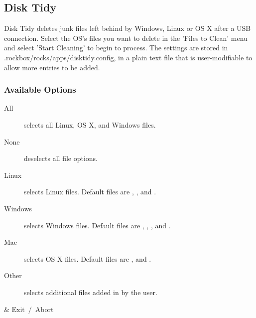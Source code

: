 \subsection{Disk Tidy}
  Disk Tidy deletes junk files left behind by Windows, Linux or OS X after a USB connection.
  Select the OS's files you want to delete in the 'Files to Clean'
  menu and select 'Start Cleaning' to begin to process. The settings
  are stored in .rockbox/rocks/apps/disktidy.config, in a plain text
  file that is user-modifiable to allow more entries to be added.

  \subsubsection{Available Options}
  \begin{description}
    \item[All] selects all Linux, OS X, and Windows files.
    \item[None] deselects all file options.
    \item[Linux] selects Linux files. Default files are
      , , and .
    \item[Windows] selects Windows files. Default files are
      , , ,  and
      .
    \item[Mac] selects OS X files. Default files are ,  and
      .
    \item[Other] selects additional files added in by the user.
  \end{description}
  
  \begin{table}
    \begin{btnmap}{}{}
      & Exit\ /\ Abort\\
    \end{btnmap}
\end{table}
